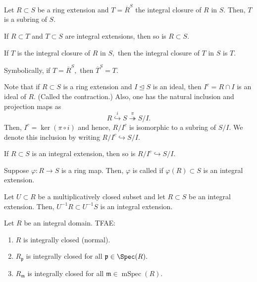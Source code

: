 \documentclass[12pt]{article}	%
\DeclareMathOperator{\mSpec}{mSpec}
\begin{document}
\begin{thm}
	Let $R \subset S$ be a ring extension and $T = \overline{R}^S$ the integral closure of $R$ in $S.$ Then, $T$ is a subring of $S.$
\end{thm}

\begin{prop}
	If $R \subset T$ and $T \subset S$ are integral extensions, then so is $R \subset S.$
\end{prop}

\begin{cor}
	If $T$ is the integral closure of $R$ in $S,$ then the integral closure of $T$ in $S$ is $T.$

	Symbolically, if $T = \overline{R}^S,$ then $\overline{T}^S = T.$
\end{cor}

Note that if $R \subset S$ is a ring extension and $I \unlhd S$ is an ideal, then $I^c = R \cap I$ is an ideal of $R.$ (Called the contraction.) Also, one has the natural inclusion and projection maps as
\begin{equation*} 
	R \overset{i}{\hookrightarrow} S \overset{\pi}{\twoheadrightarrow} S/I.
\end{equation*}
Then, $I^c = \ker (\pi \circ i)$ and hence, $R/I^c$ is isomorphic to a subring of $S/I.$ We denote this inclusion by writing $R/I^c \hookrightarrow S/I.$

\begin{prop}
	If $R \subset S$ is an integral extension, then so is $R/I^c \hookrightarrow S/I.$
\end{prop}

\begin{defn}%
	Suppose $\varphi : R \to S$ is a ring map. Then, $\varphi$ is called  if $\varphi(R) \subset S$ is an integral extension.
\end{defn}

\begin{prop}
	Let $U \subset R$ be a multiplicatively closed subset and let $R \subset S$ be an integral extension. Then, $U^{-1}R \subset U^{-1}S$ is an integral extension.
\end{prop}

\begin{prop}
	Let $R$ be an integral domain. TFAE:
	\begin{enumerate}
		\item $R$ is integrally closed (normal).
		\item $R_\mathfrak{p}$ is integrally closed for all $\mathfrak{p} \in \Spec(R).$
		\item $R_\mathfrak{m}$ is integrally closed for all $\mathfrak{m} \in \mSpec(R).$
	\end{enumerate}
\end{prop}
\end{document}
